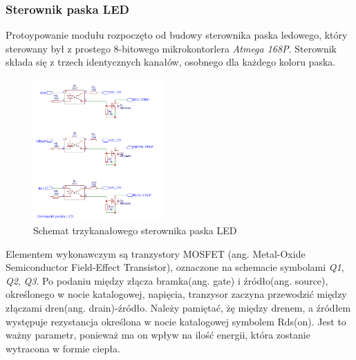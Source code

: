 \documentclass[12pt, eng, twoside, openany, final]{mgr}
\begin{document}
            \subsubsection{Sterownik paska LED}
                Protoypowanie modułu rozpoczęto od budowy sterownika paska ledowego, który sterowany był z prostego 8-bitowego mikrokontorlera \emph{Atmega 168P}. 
                Sterownik składa się z trzech identycznych kanałów, osobnego dla każdego koloru paska. 
                \begin{figure}[H]
                \begin{center}
                    \includegraphics[width=0.45\textwidth]{sterownik.png}
                    \caption{Schemat trzykanałowego sterownika paska LED}
                \end{center}
                \end{figure}
                Elementem wykonawczym są tranzystory MOSFET (ang. Metal-Oxide Semiconductor Field-Effect Transistor), oznaczone na schemacie symbolami \emph{Q1}, \emph{Q2}, \emph{Q3}. Po podaniu między złącza bramka(ang. gate) i źródło(ang. source), określonego w nocie katalogowej, napięcia, tranzysor zaczyna przewodzić między złączami dren(ang. drain)-źródło. Należy pamiętać, żę między drenem, a źródłem występuje rezystancja określona w nocie katalogowej symbolem Rds(on). Jest to ważny parametr, ponieważ ma on wpływ na ilość energii, która zostanie wytracona w formie ciepła. 
        
                \newpage
        
\end{document}
